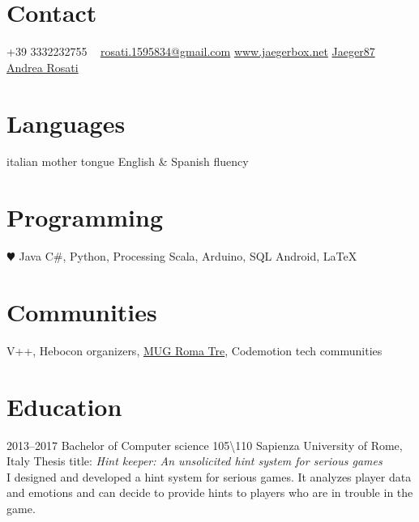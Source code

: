 \documentclass[]{friggeri-cv} %
\begin{document}


\begin{aside} %
\section{Contact}
+39 3332232755 {\color{gray} {\faPhone}}
~
\href{mailto:rosati.1595834@gmail.com}{rosati.1595834@gmail.com} {\color{gray} {\faEnvelope}}
\href{http://jaegerbox.net}{www.jaegerbox.net} {\color{gray} {\faHome}}
\href{https://github.com/Jaeger87}{Jaeger87} {\color{gray} {\faGithub}}
\href{https://it.linkedin.com/in/andrea-rosati-050091a7}{Andrea Rosati} {\color{gray} {\faLinkedin}}
\section{Languages}
italian mother tongue
English \& Spanish fluency
\section{Programming}
{\color{red} $\varheartsuit$} Java
C\#, Python, Processing
Scala, Arduino, SQL
Android, \LaTeX
\section{Communities}
V++, Hebocon organizers,
\href{http://muglab.uniroma3.it/}{MUG Roma Tre}, Codemotion tech communities 
\end{aside}




\section{Education}

\begin{entrylist}


\entry
{2013--2017}
{Bachelor {\normalfont of Computer science 105\backslash110}}
{Sapienza University of Rome, Italy}
{Thesis title: \emph{Hint keeper: An unsolicited hint system for serious games} \\I designed and developed a hint system for serious games. It analyzes player data and emotions and can decide to provide hints to players who are in trouble in the game.}


\end{entrylist}
\end{document}
